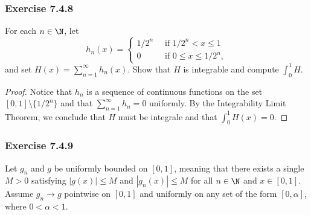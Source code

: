 \subsubsection{Exercise 7.4.8} For each \( n \in \N  \), let 
\[  h_{n}(x) = 
\begin{cases}
	1 / 2^{n} \ &\text{ if } 1/2^{n} < x \leq 1 \\
	0 \ &\text{ if } 0 \leq x \leq 1 / 2^{n},
\end{cases} \]
and set \( H(x) = \sum_{ n=1 }^{ \infty  } h_{n}(x)  \). Show that \( H  \) is integrable and compute \( \int_{ 0 }^{ 1 } H  \).
\begin{proof}
	Notice that \( h_{n}  \) is a sequence of continuous functions on the set \( [0,1] \setminus \{  1 / 2^{n}\}  \) and that \( \sum_{ n=1 }^{ \infty  } h_{n} = 0  \) uniformly.  By the Integrability Limit Theorem, we conclude that \( H  \) must be integrale and that \( \int_{ 0 }^{ 1 } H(x) = 0  \). 
\end{proof}

\subsubsection{Exercise 7.4.9} Let \( g_{n}  \) and \( g  \) be uniformly bounded on \( [0,1]  \), meaning that there exists a single \( M > 0  \) satisfying \( | g(x) | \leq M  \) and \( | g_{n}(x)  | \leq M  \) for all \( n \in \N  \) and \( x \in [0,1] \). Assume \( g_{n} \to g  \) pointwise on \( [0,1]  \) and uniformly on any set of the form \( [0, \alpha]  \), where \( 0 < \alpha < 1  \). 

